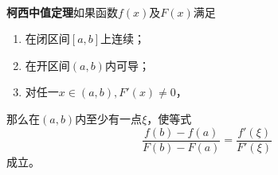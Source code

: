 \paragraph{}
\textbf{柯西中值定理\;}如果函数$f(x)$及$F(x)$满足
\begin{enumerate}
  \item 在闭区间$[a,b]$上连续；
  \item 在开区间$(a,b)$内可导；
  \item 对任一$x \in (a,b), F'(x) \neq 0$，
\end{enumerate}
那么在$(a,b)$内至少有一点$\xi$，使等式
\begin{equation}
  \frac{f(b)-f(a)}{F(b)-F(a)} = \frac{f'(\xi)}{F'(\xi)}
\end{equation}
成立。
